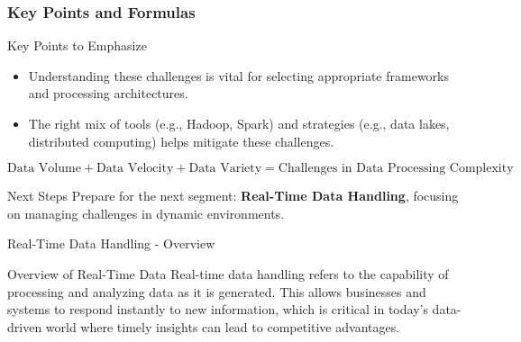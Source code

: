 \documentclass[aspectratio=169]{beamer}
\begin{document}
\begin{frame}[fragile]
    \frametitle{Key Points and Formulas}
    \begin{block}{Key Points to Emphasize}
        \begin{itemize}
            \item Understanding these challenges is vital for selecting appropriate frameworks and processing architectures.
            \item The right mix of tools (e.g., Hadoop, Spark) and strategies (e.g., data lakes, distributed computing) helps mitigate these challenges.
        \end{itemize}
    \end{block}

    \begin{equation}
        \text{Data Volume} + \text{Data Velocity} + \text{Data Variety} = \text{Challenges in Data Processing Complexity}
    \end{equation}
    
    \begin{block}{Next Steps}
        Prepare for the next segment: \textbf{Real-Time Data Handling}, focusing on managing challenges in dynamic environments.
    \end{block}
\end{frame}

\begin{frame}[fragile]{Real-Time Data Handling - Overview}
  \begin{block}{Overview of Real-Time Data}
    Real-time data handling refers to the capability of processing and analyzing data as it is generated. This allows businesses and systems to respond instantly to new information, which is critical in today's data-driven world where timely insights can lead to competitive advantages.
  \end{block}
\end{frame}
\end{document}
